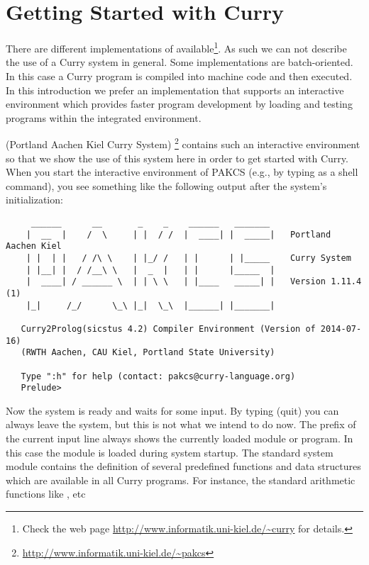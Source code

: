 \chapter{Getting Started with Curry}

There are different implementations of \curry{}
available\footnote{Check the web page
\url{http://www.informatik.uni-kiel.de/~curry} for details.}.
As such we can not describe the use of a Curry system
in general. Some implementations are batch-oriented.  In this case a 
Curry program is compiled into machine code and then executed. 
In this introduction we prefer an implementation that supports an interactive environment which provides faster program development by loading and testing programs within the integrated environment.

\pakcs{} (Portland Aachen Kiel Curry System)
\cite{Hanus14PAKCS}\footnote{\url{http://www.informatik.uni-kiel.de/~pakcs}}
contains such an interactive environment so that we show the use
of this system here in order to get started with Curry.
When you start the interactive environment of PAKCS
(e.g., by typing 
as a shell command),
you see something like the following output after the system's
initialization:
\begin{verbatim}
     ______      __       _    _    ______   _______     
    |  __  |    /  \     | |  / /  |  ____| |  _____|   Portland Aachen Kiel
    | |  | |   / /\ \    | |_/ /   | |      | |_____    Curry System
    | |__| |  / /__\ \   |  _  |   | |      |_____  |   
    |  ____| / ______ \  | | \ \   | |____   _____| |   Version 1.11.4 (1)
    |_|     /_/      \_\ |_|  \_\  |______| |_______|   
   
   Curry2Prolog(sicstus 4.2) Compiler Environment (Version of 2014-07-16)
   (RWTH Aachen, CAU Kiel, Portland State University)
   
   Type ":h" for help (contact: pakcs@curry-language.org)
   Prelude> 
\end{verbatim}
Now the system is ready and waits for some input.
By typing  (quit) you can always leave the system,
but this is not what we intend to do now.
The prefix of the current input line always shows the currently
loaded module or program. In this case the module
is loaded during system startup.
The standard system module  contains
the definition of several predefined functions and data structures
which are available in all Curry programs.
For instance, the standard arithmetic functions like \code{+}, \code{*} etc
